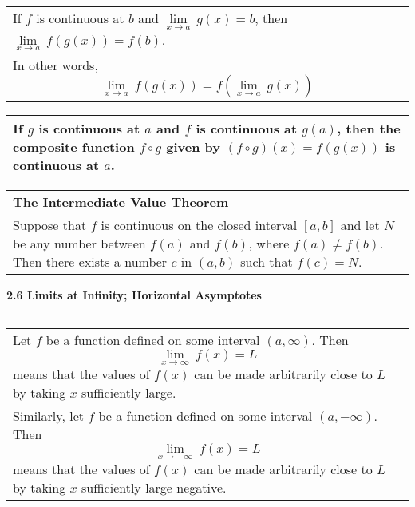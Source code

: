 \documentclass[fleqn]{article}
\begin{document}
\begin{center}
\def\arraystretch{1.3}
{\setlength{\tabcolsep}{16pt}
\begin{tabularx}{.9\textwidth}{|X|}
\hline
	\vspace{1pt}
	If $f$ is continuous at $b$ and $\underset{x \to a}{\lim} \: g(x) = b$, then $\underset{x \to a}{\lim} \: f(g(x)) = f(b)$. \\
	In other words,
	$$\underset{x \to a}{\lim} \: f(g(x)) = f(\underset{x \to a}{\lim} \: g(x))$$ \\
\hline
\end{tabularx}}
\vspace{12pt}

\def\arraystretch{1.3}
{\setlength{\tabcolsep}{16pt}
\begin{tabularx}{.9\textwidth}{|X|}
\hline
	\vspace{1pt}
	If $g$ is continuous at $a$ and $f$ is continuous at $g(a)$, then the composite function $f \circ g$ given by $(f \circ g)(x) = f(g(x))$ is continuous at $a$. \\[16pt]
	\hline
\end{tabularx}}
\vspace{12pt}

\def\arraystretch{1.3}
{\setlength{\tabcolsep}{16pt}
\begin{tabularx}{.9\textwidth}{|X|}
\hline
	\vspace{1pt}
	\textbf{The Intermediate Value Theorem} \\
	Suppose that $f$ is continuous on the closed interval $[a, b]$ and let $N$ be any number between $f(a)$ and $f(b)$, where $f(a) \ne f(b)$. Then there exists a number $c$ in $(a, b)$ such that $f(c) = N$. \\[16pt]
	\hline
\end{tabularx}}
\vspace{32pt}

\pagebreak

\Large\textbf{2.6 Limits at Infinity; Horizontal Asymptotes}

\noindent\hfill\rule{0.3\textwidth}{.4pt}\hfill
\vspace{12pt}

\large
\def\arraystretch{1.3}
{\setlength{\tabcolsep}{16pt}
\begin{tabularx}{.9\textwidth}{|X|}
\hline
	\vspace{1pt}
	Let $f$ be a function defined on some interval $(a, \infty)$. Then 
	$$\underset{x \to \infty}{\lim} \: f(x) = L$$
	means that the values of $f(x)$ can be made arbitrarily close to $L$ by taking $x$ sufficiently large. \\[5pt]
	Similarly, let $f$ be a function defined on some interval $(a, -\infty)$. Then 
	$$\underset{x \to -\infty}{\lim} \: f(x) = L$$
	means that the values of $f(x)$ can be made arbitrarily close to $L$ by taking $x$ sufficiently large negative. \\[16pt]
	\hline
\end{tabularx}}
\vspace{12pt}


\end{center}
\end{document}
